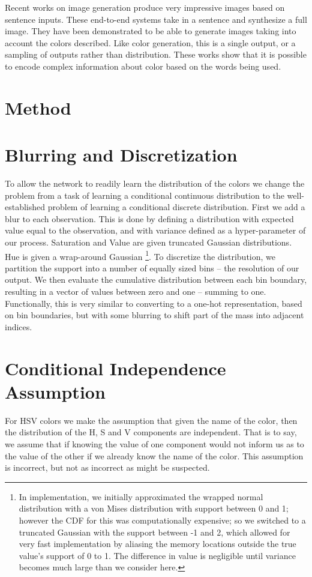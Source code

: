 \documentclass[11pt,letterpaper]{article}
\begin{document}
Recent works on image generation produce very impressive images based on sentence inputs\cite{reed2016generative,2015arXiv151102793M}.
These end-to-end systems take in a sentence and synthesize a full image.
They have been demonstrated to be able to generate images taking into account the colors described.
Like color generation, this is a single output, or a sampling of outputs rather than distribution.
These works show that it is possible to encode complex information about color based on the words being used.


\section{Method}

\section{Blurring and Discretization}
To allow the network to readily learn the distribution of the colors we change the problem from a task of learning a conditional continuous distribution to the well-established problem of learning a conditional discrete distribution.
First we add a blur to each observation.
This is done by defining a distribution with expected value equal to the observation,
and with variance defined as a hyper-parameter of our process.
Saturation and Value are given truncated Gaussian distributions.
Hue is given a wrap-around Gaussian \footnote{In implementation, we initially approximated the wrapped normal distribution with a von Mises distribution with support between 0 and 1; however the CDF for this was computationally expensive; so we switched to a truncated Gaussian with the support between -1 and 2, which allowed for very fast implementation by aliasing the memory locations outside the true value's support of 0 to 1. The difference in value is negligible until variance becomes much large than we consider here.}.
To discretize the distribution, we partition the support into a number of equally sized bins -- the resolution of our output.
We then evaluate the cumulative distribution between each bin boundary, resulting in a vector of values between zero and one -- summing to one.
Functionally, this is very similar to converting to a one-hot representation, based on bin boundaries, but with some blurring to shift part of the mass into adjacent indices.



\section{Conditional Independence Assumption}
For HSV colors we make the assumption that given the name of the color, then the distribution of the H, S and V components are independent.
That is to say, we assume that if knowing the value of one component would not inform us as to the value of the other if we already know the name of the color.
This assumption is incorrect, but not as incorrect as might be suspected.
\end{document}
